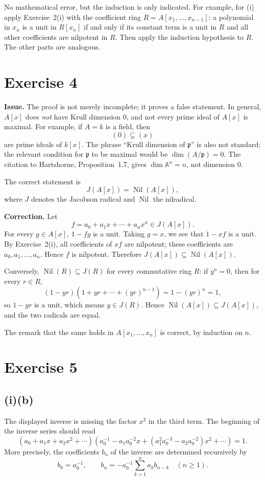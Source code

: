\documentclass[11pt]{article}
\DeclareMathOperator{\Nil}{Nil}
\newcommand{\fp}{\mathfrak p}
\begin{document}
No mathematical error, but the induction is only indicated.  For example, for
(i) apply Exercise~2(i) with the coefficient ring
\(R=A[x_1,\ldots,x_{n-1}]\): a polynomial in \(x_n\) is a unit in \(R[x_n]\)
if and only if its constant term is a unit in \(R\) and all other coefficients
are nilpotent in \(R\).  Then apply the induction hypothesis to \(R\).  The
other parts are analogous.

\section*{Exercise 4}

\textbf{Issue.}  The proof is not merely incomplete; it proves a false
statement.  In general, \(A[x]\) does \emph{not} have Krull dimension \(0\),
and not every prime ideal of \(A[x]\) is maximal.  For example, if \(A=k\) is
a field, then
\[
(0)\subsetneq (x)
\]
are prime ideals of \(k[x]\).  The phrase ``Krull dimension of \(\fp\)'' is
also not standard; the relevant condition for \(\fp\) to be maximal would be
\(\dim(A/\fp)=0\).  The citation to Hartshorne, Proposition~1.7, gives
\(\dim\mathbb A^n=n\), not dimension \(0\).

The correct statement is
\[
J(A[x])=\Nil(A[x]),
\]
where \(J\) denotes the Jacobson radical and \(\Nil\) the nilradical.

\textbf{Correction.}  Let
\[
f=a_0+a_1x+\cdots+a_nx^n\in J(A[x]).
\]
For every \(g\in A[x]\), \(1-fg\) is a unit.  Taking \(g=x\), we see that
\(1-xf\) is a unit.  By Exercise~2(i), all coefficients of \(xf\) are
nilpotent; these coefficients are \(a_0,a_1,\ldots,a_n\).  Hence \(f\) is
nilpotent.  Therefore \(J(A[x])\subseteq\Nil(A[x])\).

Conversely, \(\Nil(R)\subseteq J(R)\) for every commutative ring \(R\): if
\(y^n=0\), then for every \(r\in R\),
\[
(1-yr)(1+yr+\cdots+(yr)^{n-1})=1-(yr)^n=1,
\]
so \(1-yr\) is a unit, which means \(y\in J(R)\).  Hence
\(\Nil(A[x])\subseteq J(A[x])\), and the two radicals are equal.

The remark that the same holds in
\(A[x_1,\ldots,x_n]\) is correct, by induction on \(n\).

\section*{Exercise 5}

\subsection*{(i)(b)}
The displayed inverse is missing the factor \(x^2\) in the third term.  The
beginning of the inverse series should read
\[
(a_0+a_1x+a_2x^2+\cdots)
\left(a_0^{-1}-a_1a_0^{-2}x+
(a_1^2a_0^{-3}-a_2a_0^{-2})x^2+\cdots\right)=1.
\]
More precisely, the coefficients \(b_n\) of the inverse are determined
recursively by
\[
b_0=a_0^{-1},\qquad
b_n=-a_0^{-1}\sum_{k=1}^{n}a_kb_{n-k}\quad(n\ge1).
\]
\end{document}
